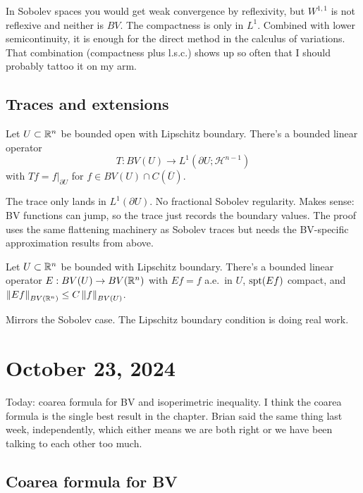In Sobolev spaces you would get weak convergence by reflexivity, but $W^{1,1}$ is not reflexive and neither is $BV$. The compactness is only in $L^1$. Combined with lower semicontinuity, it is enough for the direct method in the calculus of variations. That combination (compactness plus l.s.c.) shows up so often that I should probably tattoo it on my arm.

\subsection{Traces and extensions}\label{subsec:trace-ext}

\begin{theorem}\label{thm:trace-bv}
Let $U \subset \mathbb{R}^n$ be bounded open with Lipschitz boundary. There's a bounded linear operator
\[
  T: BV(U) \to L^1(\partial U; \mathcal{H}^{n-1})
\]
with $Tf = f|_{\partial U}$ for $f \in BV(U) \cap C(\overline{U})$.
\end{theorem}

The trace only lands in $L^1(\partial U)$. No fractional Sobolev regularity. Makes sense: BV functions can jump, so the trace just records the boundary values. The proof uses the same flattening machinery as Sobolev traces but needs the BV-specific approximation results from above.

\begin{theorem}[Extension]\label{thm:extension-bv}
Let $U \subset \mathbb{R}^n$ be bounded with Lipschitz boundary. There's a bounded linear operator $E: BV(U) \to BV(\mathbb{R}^n)$ with $Ef = f$ a.e.\ in $U$, $\operatorname{spt}(Ef)$ compact, and $\left\|Ef\right\|_{BV(\mathbb{R}^n)} \le C \left\|f\right\|_{BV(U)}$.
\end{theorem}

Mirrors the Sobolev case. The Lipschitz boundary condition is doing real work.


\section{October 23, 2024}\label{sec:oct23}

Today: coarea formula for BV and isoperimetric inequality. I think the coarea formula is the single best result in the chapter. Brian said the same thing last week, independently, which either means we are both right or we have been talking to each other too much.

\subsection{Coarea formula for BV}\label{subsec:coarea}

